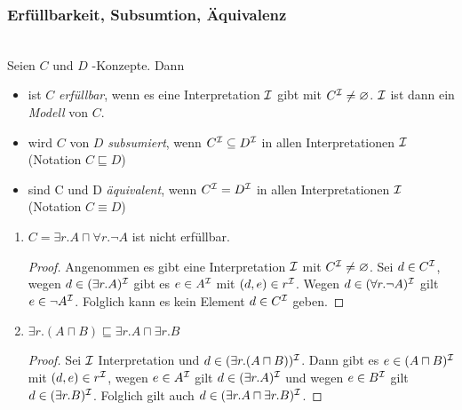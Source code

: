 \subsubsection{Erfüllbarkeit, Subsumtion, Äquivalenz}
\label{sec:erfull-subsum-equiv}
\label{erfuxfcllbarkeit-subsumtion-uxe4quivalenz}

\begin{definition}
    \mbox{}\\Seien $C$ und $D$ \ALC-Konzepte. Dann
\begin{itemize}
\item
  ist $C$ \emph{erfüllbar}, wenn es eine Interpretation $\mathcal{I}$ gibt mit
  $C^{\mathcal{I}} \neq \varnothing$. $\mathcal{I}$ ist dann ein \emph{Modell} von
  $C$.
\item
  wird $C$ von $D$ \emph{subsumiert}, wenn $C^{\mathcal{I}} \subseteq D^{\mathcal{I}}$
  in allen Interpretationen $\mathcal{I}$ (Notation $C \sqsubseteq D$)
\item
  sind C und D \emph{äquivalent}, wenn $C^{\mathcal{I}} = D^{\mathcal{I}}$ in allen
  Interpretationen $\mathcal{I}$ (Notation $C \equiv D$)
\end{itemize}
\end{definition}

\begin{tafel} \mbox{}
    \begin{enumerate}[label=\alph*)]
        \item $C = \exists r.A \sqcap \forall r.\neg A$ ist nicht erfüllbar.
            \begin{proof}
                Angenommen es gibt eine Interpretation $\mathcal{I}$ mit $C^{\mathcal{I}} \neq \varnothing$. Sei $d\in C^{\mathcal{I}}$, wegen $d \in (\exists r.A)^{\mathcal{I}}$ gibt es $e \in A^{\mathcal{I}}$ mit $(d, e) \in r^{\mathcal{I}}$. Wegen $d \in (\forall r.\neg A)^{\mathcal{I}}$ gilt $e\in \neg A^{\mathcal{I}}$. Folglich kann es kein Element $d \in C^{\mathcal{I}}$ geben.
            \end{proof}
        \item $\exists r.(A\sqcap B) \sqsubseteq  \exists r.A \sqcap \exists r.B$
            \begin{proof}
                Sei $\mathcal{I}$ Interpretation und $d \in (\exists r. (A\sqcap B))^{\mathcal{I}}$. Dann gibt es $e \in (A\sqcap B)^{\mathcal{I}}$ mit $(d, e) \in r^{\mathcal{I}}$, wegen $e \in A^{\mathcal{I}}$ gilt $d \in (\exists r.A)^{\mathcal{I}}$ und wegen $e \in B^{\mathcal{I}}$ gilt $d \in (\exists r.B)^{\mathcal{I}}$. Folglich gilt auch $d \in (\exists r.A \sqcap \exists r.B)^{\mathcal{I}}$.
            \end{proof}
    \end{enumerate}
\end{tafel}

